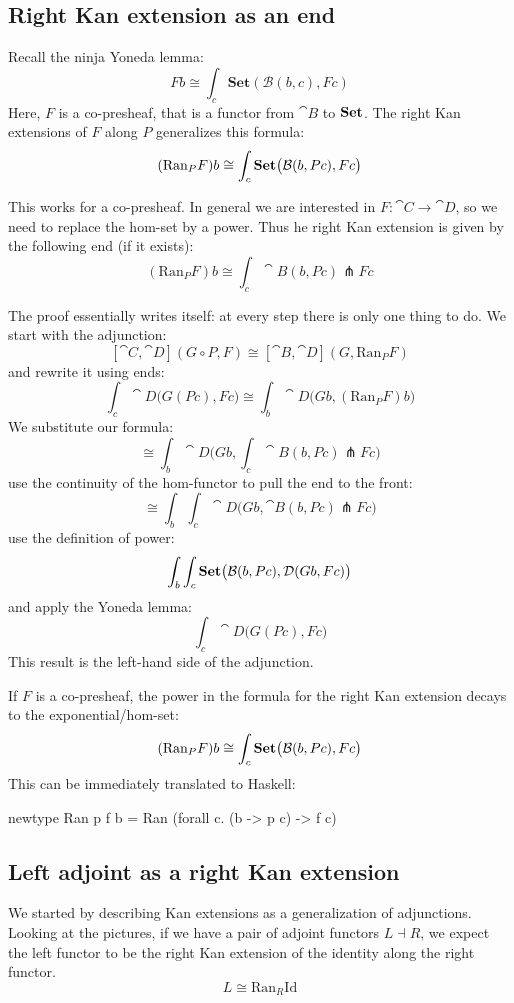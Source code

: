 \documentclass[DaoFP]{subfiles}
\begin{document}
\subsection{Right Kan extension as an end}

Recall the ninja Yoneda lemma:
\[ F b \cong \int_{c} \mathbf{Set} (\mathcal{B}(b, c), F c) \]
Here, $F$ is a co-presheaf, that is a functor from $\cat B$ to $\mathbf{Set}$. The right Kan extensions of $F$ along $P$ generalizes this formula:
\[ (\text{Ran}_P F) b \cong \int_c \mathbf{Set} \big( \mathcal{B} (b, P c), F c\big) \]

This works for a co-presheaf. In general we are interested in $F \colon \cat C \to \cat D$, so we need to replace the hom-set by a power. Thus he right Kan extension is given by the following end (if it exists):
 \[ (\text{Ran}_P F) b \cong \int_c \cat B (b, P c) \pitchfork F c \]
 
 The proof essentially writes itself: at every step there is only one thing to do. We start with the adjunction:
  \[ [\cat C, \cat D](G \circ P, F) \cong [\cat B, \cat D](G, \text{Ran}_P F) \]
and rewrite it using ends:
 \[ \int_c \cat D \big(G ( P c), F c\big) \cong \int_b \cat D\big(G b, (\text{Ran}_P F) b\big) \]
We substitute our formula:
 \[ \cong  \int_b \cat D\big(G b,\int_c \cat B (b, P c) \pitchfork F c \big)\]
use the continuity of the hom-functor to pull the end to the front:
\[  \cong  \int_b \int_c \cat D\big(G b, \cat B (b, P c) \pitchfork F c \big) \]
use the definition of power:
\[ \int_b \int_c \mathbf{Set} \big(  \mathcal{B} (b, P c), \mathcal{D} (G b, F c) \big) \]
and apply the Yoneda lemma:
\[ \int_c  \cat D \big(G (P c), F c\big) \]
This result is the left-hand side of the adjunction.
 
If $F$ is a co-presheaf, the power in the formula for the right Kan extension decays to the exponential/hom-set:
  \[ (\text{Ran}_P F) b \cong \int_c \mathbf{Set} \big( \mathcal{B} (b, P c), F c\big) \]
This can be immediately translated to Haskell:
 \begin{haskell}
 newtype Ran p f b = Ran (forall c. (b -> p c) -> f c)
 \end{haskell}
 
 \subsection{Left adjoint as a right Kan extension}
 
 We started by describing Kan extensions as a generalization of adjunctions. Looking at the pictures, if we have a pair of adjoint functors $L \dashv R$, we expect the left functor to be the right Kan extension of the identity along the right functor.
 \[ L \cong \text{Ran}_R \text{Id} \]
 
\end{document}
